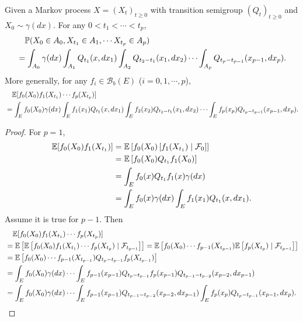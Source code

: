 \begin{thm}
    Given a Markov process $X =(X_t)_{t \geq 0}$ with transition semigroup $(Q_t)_{t \geq 0}$ and $X_0 \sim \gamma(dx)$. For any $0 < t_1 < \cdots < t_p$,
    \begin{align*}
        &\quad\mathbb{P}(X_0 \in A_0,X_{t_1} \in A_1,\cdots X_{t_p} \in A_p) \\
        &= \int_{A_0} \gamma(dx) \int_{A_1} Q_{t_1}(x,dx_1) \int_{A_2} Q_{t_2-t_1}(x_1,dx_2) \cdots \int_{A_p}Q_{t_p-t_{p-1}}(x_{p-1},dx_p).
    \end{align*}
    More generally, for any $f_i \in \mathcal{B}_b(E)$ ($i=0,1,\cdots,p$),
    \begin{align*}
        &\quad\mathbb{E}[f_0(X_0)f_1(X_{t_1})\cdots f_p(X_{t_p})] \\
        &= \int_{E}f_0(X_0) \gamma(dx) \int_{E}f_1(x_1) Q_{t_1}(x,dx_1) \int_{E}f_2(x_2) Q_{t_2-t_1}(x_1,dx_2) \cdots \int_{E} f_p(x_p)Q_{t_p-t_{p-1}}(x_{p-1},dx_p).
    \end{align*}
\end{thm}
\begin{proof}
    For $p = 1$,
    \begin{align*}
        \mathbb{E}[f_0(X_0)f_1(X_{t_1})] &= \mathbb{E}\left[f_0(X_0)\left[ f_1(X_{t_1})\mid \mathcal{F}_0\right] \right] \\
        &= \mathbb{E}\left[f_0(X_0) Q_{t_1}f_1(X_0)\right] \\
        &= \int_E f_0(x) Q_{t_1}f_1(x)\gamma(dx) \\
        &= \int_E f_0(x) \gamma(dx) \int_E f_1(x_1)Q_{t_1}(x,dx_1).
    \end{align*}
    Assume it is true for $p-1$. Then
    \begin{align*}
        &\quad\mathbb{E}[f_0(X_0)f_1(X_{t_1})\cdots f_p(X_{t_p})] \\
        &= \mathbb{E}\left[ \mathbb{E}\left[ f_0(X_0)f_1(X_{t_1})\cdots f_p(X_{t_p}) \mid \mathcal{F}_{t_{p-1}} \right] \right] = \mathbb{E}\left[f_0(X_0)\cdots f_{p-1}(X_{t_{p-1}}) \mathbb{E}\left[f_p(X_{t_p}) \mid \mathcal{F}_{t_{p-1}} \right] \right]\\
        &= \mathbb{E}\left[f_0(X_0)\cdots f_{p-1}(X_{t_{p-1}})Q_{t_p - t_{p-1}}f_p(X_{t_{p-1}})\right] \\
        &= \int_{E}f_0(X_0) \gamma(dx) \cdots \int_{E} f_{p-1}(x_{p-1})Q_{t_p - t_{p-1}}f_p(x_{p-1})Q_{t_{p-1}-t_{p-2}}(x_{p-2},dx_{p-1})\\
        &= \int_{E}f_0(X_0) \gamma(dx) \cdots \int_{E} f_{p-1}(x_{p-1})Q_{t_{p-1}-t_{p-2}}(x_{p-2},dx_{p-1})\int_E f_p(x_p)Q_{t_p - t_{p-1}}(x_{p-1},dx_p). \qedhere
    \end{align*}
\end{proof}

